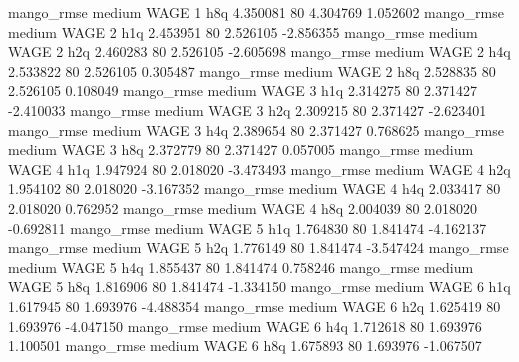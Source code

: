        mango_rmse     medium     WAGE                 1                  h8q  4.350081 80       4.304769           1.052602
       mango_rmse     medium     WAGE                 2                  h1q  2.453951 80       2.526105          -2.856355
       mango_rmse     medium     WAGE                 2                  h2q  2.460283 80       2.526105          -2.605698
       mango_rmse     medium     WAGE                 2                  h4q  2.533822 80       2.526105           0.305487
       mango_rmse     medium     WAGE                 2                  h8q  2.528835 80       2.526105           0.108049
       mango_rmse     medium     WAGE                 3                  h1q  2.314275 80       2.371427          -2.410033
       mango_rmse     medium     WAGE                 3                  h2q  2.309215 80       2.371427          -2.623401
       mango_rmse     medium     WAGE                 3                  h4q  2.389654 80       2.371427           0.768625
       mango_rmse     medium     WAGE                 3                  h8q  2.372779 80       2.371427           0.057005
       mango_rmse     medium     WAGE                 4                  h1q  1.947924 80       2.018020          -3.473493
       mango_rmse     medium     WAGE                 4                  h2q  1.954102 80       2.018020          -3.167352
       mango_rmse     medium     WAGE                 4                  h4q  2.033417 80       2.018020           0.762952
       mango_rmse     medium     WAGE                 4                  h8q  2.004039 80       2.018020          -0.692811
       mango_rmse     medium     WAGE                 5                  h1q  1.764830 80       1.841474          -4.162137
       mango_rmse     medium     WAGE                 5                  h2q  1.776149 80       1.841474          -3.547424
       mango_rmse     medium     WAGE                 5                  h4q  1.855437 80       1.841474           0.758246
       mango_rmse     medium     WAGE                 5                  h8q  1.816906 80       1.841474          -1.334150
       mango_rmse     medium     WAGE                 6                  h1q  1.617945 80       1.693976          -4.488354
       mango_rmse     medium     WAGE                 6                  h2q  1.625419 80       1.693976          -4.047150
       mango_rmse     medium     WAGE                 6                  h4q  1.712618 80       1.693976           1.100501
       mango_rmse     medium     WAGE                 6                  h8q  1.675893 80       1.693976          -1.067507
